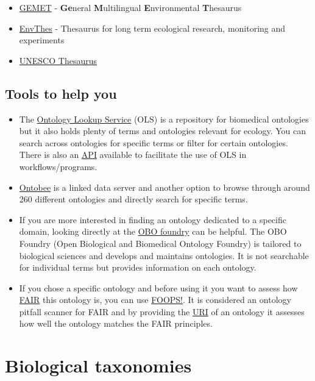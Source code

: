 \documentclass[
  oneside]{book}
\begin{document}
\begin{itemize}
\item
  \href{https://www.eionet.europa.eu/gemet/en/themes/}{GEMET} - \textbf{Ge}neral \textbf{M}ultilingual \textbf{E}nvironmental \textbf{T}hesaurus
\item
  \href{https://vocabs.lter-europe.net/envthes/en/}{EnvThes} - Thesaurus for long term ecological research, monitoring and experiments
\item
  \href{https://vocabularies.unesco.org/browser/thesaurus/en/}{UNESCO Thesaurus}
\end{itemize}

\subsection{Tools to help you}\label{tools-to-help-you-2}

\begin{itemize}
\item
  The \href{http://ebi.ac.uk/ols4/}{Ontology Lookup Service} (OLS) is a repository for biomedical ontologies but it also holds plenty of terms and ontologies relevant for ecology. You can search across ontologies for specific terms or filter for certain ontologies. There is also an \hyperref[API]{API} available to facilitate the use of OLS in workflows/programs.
\item
  \href{http://ontobee.org}{Ontobee} is a linked data server and another option to browse through around 260 different ontologies and directly search for specific terms.
\item
  If you are more interested in finding an ontology dedicated to a specific domain, looking directly at the \href{http://obofoundry.org/}{OBO foundry} can be helpful. The OBO Foundry (Open Biological and Biomedical Ontology Foundry) is tailored to biological sciences and develops and maintains ontologies. It is not searchable for individual terms but provides information on each ontology.
\item
  If you chose a specific ontology and before using it you want to assess how \hyperref[FAIR]{FAIR} this ontology is, you can use \href{https://foops.linkeddata.es/FAIR_validator.html\#}{FOOPS!}. It is considered an ontology pitfall scanner for FAIR and by providing the \hyperref[URI]{URI} of an ontology it assesses how well the ontology matches the FAIR principles.
\end{itemize}

\section{Biological taxonomies}\label{biological-taxonomies}
\end{document}
